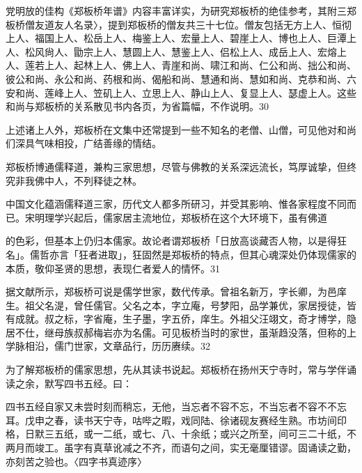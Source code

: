党明放的佳构《郑板桥年谱》内容丰富详实，为研究郑板桥的绝佳参考，其附三郑板桥僧友道友人名录〉，提到郑板桥的僧友共三十七位。僧友包括无方上人、恒彻上人、福国上人、松岳上人、梅鉴上人、宏量上人、碧崖上人、博也上人、巨潭上人、松风尙人、勖宗上人、慧圆上人、慧鉴上人、侣松上人、成岳上人、宏熔上人、莲若上人、起林上人、佛上人、青崖和尚、啸江和尚、仁公和尚、拙公和尚、彼公和尚、永公和尚、药根和尚、偈船和尚、慧通和尚、慧如和尚、克恭和尚、六安和尚、莲峰上人、笠矶上人、立思上人、静山上人、复显上人、瑟虚上人。这些和尚与郑板桥的关系散见书内各页，为省篇幅，不作说明。30

上述诸上人外，郑板桥在文集中还常提到一些不知名的老僧、山僧，可见他对和尚们深具气味相投，广结善缘的情结。


郑板桥博通儒释道，兼构三家思想，尽管与佛教的关系深远流长，笃厚诚挚，但终究非我佛中人，不列释徒之林。


中国文化蕴涵儒释道三家，历代文人都多所研习，并受其影响、惟各家程度不同而已。宋明理学兴起后，儒家居主流地位，郑板桥在这个大环境下，虽有佛道

\vfill
\begin{BookNotes}
\end{BookNotes}

\noindent 的色彩，但基本上仍归本儒家。故论者谓郑板桥「日放高谈藏否人物，以是得狂名」。儒哲亦言「狂者进取」，狂固然是郑板桥的特点，但其心魂深处仍体现儒家的本质，敬仰圣贤的思想，表现仁者爱人的情怀。31

据文献所示，郑板桥可说是儒学世家，数代传承。曾祖名新万，字长卿，为邑庠生。祖父名湜，曾任儒官。父名之本，字立庵，号梦阳，品学兼优，家居授徒，皆有成就。叔之标，字省庵，生子墨，字五侨，庠生。外祖父汪翊文，奇才博学，隐居不仕，继母族叔郝梅岩亦为名儒。可见板桥当时的家世，虽渐趋没落，但称的上学脉相沿，儒门世家，文章品行，历历赓续。32

为了解郑板桥的儒家思想，先从其读书说起。郑板桥在扬州天宁寺时，常与学伴诵读之余，默写四书五经。曰：

\begin{BookQuote}
四书五经自家又未尝时刻而稍忘，无他，当忘者不容不忘，不当忘者不容不不忘耳。戊申之春，读书天宁寺，咕哔之暇，戏同陆、徐诸砚友赛经生熟。市坊间印格，日默三五纸，或一二纸，或七、八、十余纸；或兴之所至，间可三二十纸，不两月而竣工。虽字有真草讹减之不齐，而语句之间，实无毫厘错谬。固诵读之勤，亦刻苦之验也。〈四字书真迹序〉
\end{BookQuote}

